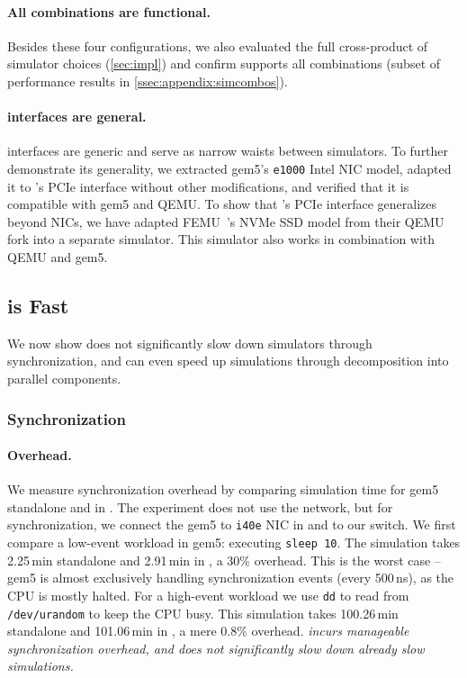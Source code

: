 \paragraph{All combinations are functional.}
Besides these four configurations, we also evaluated the full cross-product of
simulator choices (\autoref{sec:impl}) and confirm \sysname supports all
combinations (subset of performance results in
\autoref{ssec:appendix:simcombos}).

\paragraph{\sysname interfaces are general.}
\sysname interfaces are generic and serve as narrow waists between
simulators.
%
To further demonstrate its generality, we extracted gem5's
\texttt{e1000} Intel NIC model, adapted it to \sysname's PCIe
interface without other modifications, and verified that it is
compatible with gem5 and QEMU.
%
To show that \sysname's PCIe interface generalizes beyond NICs, we
have adapted FEMU~\cite{li:femu}'s NVMe SSD model from their QEMU
fork into a separate simulator.
%
This simulator also works in combination with QEMU and gem5.


\subsection{\sysname is Fast}
We now show \sysname does not significantly slow down simulators
through synchronization, and can even speed up simulations through
decomposition into parallel components.

\subsubsection{Synchronization}
\label{ssec:eval:syncproto}

\paragraph{Overhead.}
We measure synchronization overhead by comparing simulation time
for gem5 standalone and in \sysname.
%
The experiment does not use the network, but for synchronization, we
connect the gem5 to \texttt{i40e} NIC in \sysname and to our switch.
%
We first compare a low-event workload in gem5: executing
\texttt{sleep 10}.
%
The simulation takes 2.25\,min standalone and 2.91\,min in \sysname, a
30\% overhead.
%
This is the worst case -- gem5 is almost exclusively handling
\sysname synchronization events (every 500\,ns), as the CPU is mostly
halted.
%
For a high-event workload we use \texttt{dd} to read from
\texttt{/dev/urandom} to keep the CPU busy.
%
This simulation takes 100.26\,min standalone and 101.06\,min in
\sysname, a mere 0.8\% overhead.
%
\emph{\sysname incurs manageable synchronization overhead, and
does not significantly slow down already slow simulations.}

